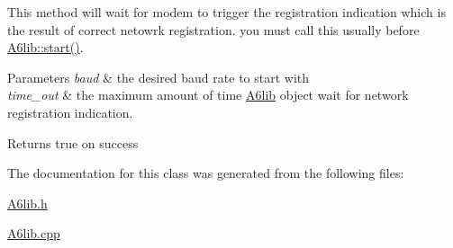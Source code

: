 This method will wait for modem to trigger the registration indication which is the result of correct netowrk registration. you must call this usually before \mbox{\hyperlink{class_a6lib_a811c9dfff81c0a4fbdbc9ce824ad83d3}{A6lib\+::start()}}. 
\begin{DoxyParams}{Parameters}
{\em baud} & the desired baud rate to start with \\
\hline
{\em time\+\_\+out} & the maximum amount of time \mbox{\hyperlink{class_a6lib}{A6lib}} object wait for network registration indication. \\
\hline
\end{DoxyParams}
\begin{DoxyReturn}{Returns}
true on success 
\end{DoxyReturn}


The documentation for this class was generated from the following files\+:\begin{DoxyCompactItemize}
\item 
\mbox{\hyperlink{_a6lib_8h}{A6lib.\+h}}\item 
\mbox{\hyperlink{_a6lib_8cpp}{A6lib.\+cpp}}\end{DoxyCompactItemize}
